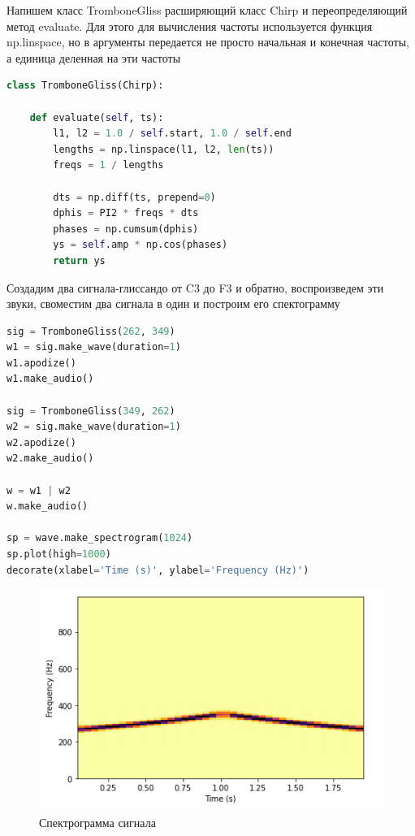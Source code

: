 Напишем класс TromboneGliss расширяющий класс Chirp и переопределяющий метод evaluate. Для этого для вычисления частоты используется функция np.linspace, но в аргументы передается не просто начальная и конечная частоты, а единица деленная на эти частоты

\begin{lstlisting}[language=Python]
class TromboneGliss(Chirp):
        
    def evaluate(self, ts):
        l1, l2 = 1.0 / self.start, 1.0 / self.end
        lengths = np.linspace(l1, l2, len(ts))
        freqs = 1 / lengths
        
        dts = np.diff(ts, prepend=0)
        dphis = PI2 * freqs * dts
        phases = np.cumsum(dphis)
        ys = self.amp * np.cos(phases)
        return ys
\end{lstlisting}

Создадим два сигнала-глиссандо от C3 до F3 и обратно, воспроизведем эти звуки, своместим два сигнала в один и построим его спектограмму

\begin{lstlisting}[language=Python]
sig = TromboneGliss(262, 349)
w1 = sig.make_wave(duration=1)
w1.apodize()
w1.make_audio()

sig = TromboneGliss(349, 262)
w2 = sig.make_wave(duration=1)
w2.apodize()
w2.make_audio()

w = w1 | w2
w.make_audio()

sp = wave.make_spectrogram(1024)
sp.plot(high=1000)
decorate(xlabel='Time (s)', ylabel='Frequency (Hz)')
\end{lstlisting}

\begin{figure}[H]
	\begin{center}
		\includegraphics[scale=1]{fig/lab03/lab03_13.png}
		\caption{Спектрограмма сигнала}
	\end{center}
\end{figure}


